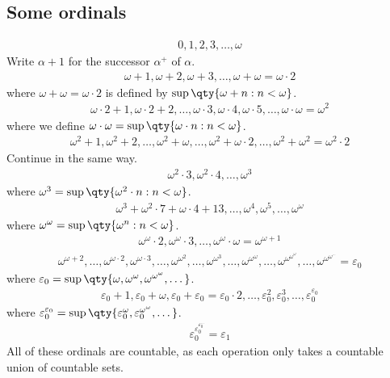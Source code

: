 \subsection{Some ordinals}
\begin{align*}
       0, 1, 2, 3, \dots, \omega
    \end{align*}
Write $\alpha + 1$ for the successor $\alpha^+$ of $\alpha$.
\begin{align*}
       \omega + 1, \omega + 2, \omega + 3, \dots, \omega + \omega = \omega \cdot 2
    \end{align*}
where $\omega + \omega = \omega \cdot 2$ is defined by $\sup \qty{\omega + n : n < \omega}$.
\begin{align*}
       \omega \cdot 2 + 1, \omega \cdot 2 + 2, \dots, \omega \cdot 3, \omega \cdot 4, \omega \cdot 5, \dots, \omega \cdot \omega = \omega^2
    \end{align*}
where we define $\omega \cdot \omega = \sup \qty{\omega \cdot n : n < \omega}$.
\begin{align*}
       \omega^2 + 1, \omega^2 + 2, \dots, \omega^2 + \omega, \dots, \omega^2 + \omega \cdot 2, \dots, \omega^2 + \omega^2 = \omega^2 \cdot 2
    \end{align*}
Continue in the same way.
\begin{align*}
       \omega^2 \cdot 3, \omega^2 \cdot 4, \dots, \omega^3
    \end{align*}
where $\omega^3 = \sup\qty{\omega^2 \cdot n : n < \omega}$.
\begin{align*}
       \omega^3 + \omega^2 \cdot 7 + \omega \cdot 4 + 13, \dots, \omega^4, \omega^5, \dots, \omega^\omega
    \end{align*}
where $\omega^\omega = \sup \qty{\omega^n : n < \omega}$.
\begin{align*}
       \omega^\omega \cdot 2, \omega^\omega \cdot 3, \dots, \omega^\omega \cdot \omega = \omega^{\omega + 1}
    \end{align*}
\begin{align*}
       \omega^{\omega + 2}, \dots, \omega^{\omega \cdot 2}, \omega^{\omega \cdot 3}, \dots, \omega^{\omega^2}, \dots, \omega^{\omega^3}, \dots, \omega^{\omega^\omega}, \dots, \omega^{\omega^{\omega^\omega}}, \dots, \omega^{\omega^{\omega^{\dots}}} = \varepsilon_0
    \end{align*}
where $\varepsilon_0 = \sup\qty{\omega, \omega^\omega, \omega^{\omega^\omega}, \dots}$.
\begin{align*}
       \varepsilon_0 + 1, \varepsilon_0 + \omega, \varepsilon_0 + \varepsilon_0 = \varepsilon_0 \cdot 2, \dots, \varepsilon_0^2, \varepsilon_0^3, \dots, \varepsilon_0^{\varepsilon_0}
    \end{align*}
where $\varepsilon_0^{\varepsilon_0} = \sup\qty{\varepsilon_0^\omega, \varepsilon_0^{\omega^\omega}, \dots}$.
\begin{align*}
       \varepsilon_0^{\varepsilon_0^{\varepsilon_0^{\dots}}} = \varepsilon_1
    \end{align*}
All of these ordinals are countable, as each operation only takes a countable union of countable sets.


